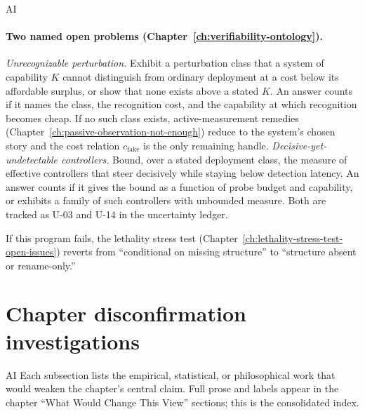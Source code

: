 \begin{authbar}{AI}
\paragraph{Two named open problems (Chapter~\ref{ch:verifiability-ontology}).}
\emph{Unrecognizable perturbation.} Exhibit a perturbation class that a system of capability $K$ cannot distinguish from ordinary deployment at a cost below its affordable surplus, or show that none exists above a stated $K$. An answer counts if it names the class, the recognition cost, and the capability at which recognition becomes cheap. If no such class exists, active-measurement remedies (Chapter~\ref{ch:passive-observation-not-enough}) reduce to the system's chosen story and the cost relation $c_{\mathrm{fake}}$ is the only remaining handle.
\emph{Decisive-yet-undetectable controllers.} Bound, over a stated deployment class, the measure of effective controllers that steer decisively while staying below detection latency. An answer counts if it gives the bound as a function of probe budget and capability, or exhibits a family of such controllers with unbounded measure. Both are tracked as U-03 and U-14 in the uncertainty ledger.

If this program fails, the lethality stress test (Chapter~\ref{ch:lethality-stress-test-open-issues}) reverts from ``conditional on missing structure'' to ``structure absent or rename-only.''

\end{authbar}
\authbarneedspace
\section{Chapter disconfirmation investigations}
\begin{authbar}{AI}
Each subsection lists the empirical, statistical, or philosophical work that would weaken the chapter's central claim.
Full prose and labels appear in the chapter ``What Would Change This View'' sections; this is the consolidated index.

\end{authbar}
\authbarsubneedspace
